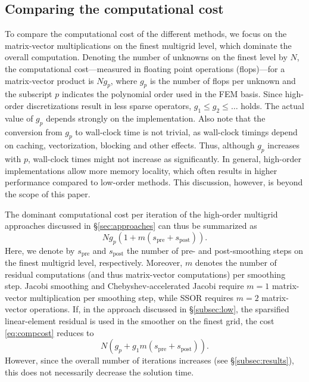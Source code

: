 \documentclass[times]{nlaauth}
\begin{document}
\subsection{Comparing the computational cost}\label{subsec:complexity}
To compare the computational cost of the different methods, we focus
on the matrix-vector multiplications on the finest multigrid level,
which dominate the overall computation. Denoting the number of
unknowns on the finest level by $N$, the computational cost---measured
in floating point operations (flops)---for a matrix-vector product is
$Ng_p$, where $g_p$ is the number of flops per unknown and the
subscript $p$ indicates the polynomial order used in the FEM basis.
Since high-order discretizations result in less sparse operators,
$g_1\le g_2\le \ldots$ holds. The actual value of $g_p$ depends
strongly on the implementation. Also note that the conversion from
$g_p$ to wall-clock time is not trivial, as wall-clock timings depend
on caching, vectorization, blocking and other effects. Thus,
although $g_p$ increases with $p$, wall-clock
times might not increase as significantly.
In general, high-order implementations allow more memory locality,
which often results in higher performance compared to low-order
methods.
This discussion, however, is beyond the scope of this paper.


The dominant computational cost per iteration of the high-order
multigrid approaches discussed in \S\ref{sec:approaches} can
thus be summarized as
\begin{equation}\label{eq:compcost}
  Ng_p(1+m(s_\text{pre}+s_\text{post})).
\end{equation}
Here, we denote by $s_\text{pre}$ and $s_\text{post}$ the number of
pre- and post-smoothing steps on the finest multigrid level,
respectively. Moreover, $m$ denotes the number of residual
computations (and thus matrix-vector computations) per smoothing step.
Jacobi smoothing and Chebyshev-accelerated Jacobi require $m=1$
matrix-vector multiplication per smoothing step, while SSOR requires
$m=2$ matrix-vector operations. If, in the approach discussed in
\S\ref{subsec:low}, the sparsified linear-element residual is used in the
smoother on the finest grid, the cost \eqref{eq:compcost} reduces to
\begin{equation}\label{eq:compcost2}
  N(g_p + g_1 m(s_\text{pre}+s_\text{post})).
\end{equation}
However, since the overall number of iterations increases (see
\S\ref{subsec:results}), this does not necessarily decrease the
solution time.
\end{document}
